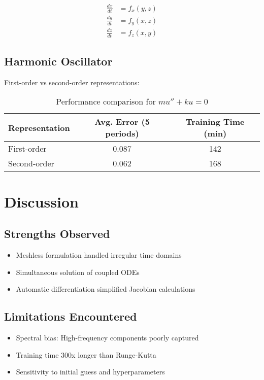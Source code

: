 \documentclass{article}
\begin{document}
\begin{align*}
\frac{dx}{dt} &= f_x(y,z) \\
\frac{dy}{dt} &= f_y(x,z) \\
\frac{dz}{dt} &= f_z(x,y)
\end{align*}

\subsection{Harmonic Oscillator}
First-order vs second-order representations:

\begin{table}[h]
\centering
\begin{tabular}{@{}lcc@{}}
\toprule
Representation & Avg. Error (5 periods) & Training Time (min) \\
\midrule
First-order & 0.087 & 142 \\
Second-order & 0.062 & 168 \\
\bottomrule
\end{tabular}
\caption{Performance comparison for $mu'' + ku = 0$}
\end{table}

\section{Discussion}

\subsection{Strengths Observed}
\begin{itemize}
\item Meshless formulation handled irregular time domains
\item Simultaneous solution of coupled ODEs
\item Automatic differentiation simplified Jacobian calculations
\end{itemize}

\subsection{Limitations Encountered}
\begin{itemize}
\item Spectral bias: High-frequency components poorly captured
\item Training time 300x longer than Runge-Kutta
\item Sensitivity to initial guess and hyperparameters
\end{itemize}
\end{document}
